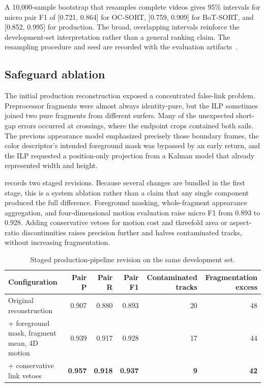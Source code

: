 A 10,000-sample bootstrap that resamples complete videos gives 95\% intervals for
micro pair F1 of [0.721, 0.864] for OC-SORT, [0.759, 0.909] for BoT-SORT, and
[0.852, 0.995] for production.  The broad, overlapping intervals reinforce the
development-set interpretation rather than a general ranking claim.  The resampling
procedure and seed are recorded with the evaluation artifacts~\cite{projectresources}.

\subsection{Safeguard ablation}

The initial production reconstruction exposed a concentrated false-link problem.
Preprocessor fragments were almost always identity-pure, but the ILP sometimes joined
two pure fragments from different surfers.  Many of the unexpected short-gap errors
occurred at crossings, where the endpoint crops contained both sails.  The previous
appearance model emphasized precisely those boundary frames, the color descriptor's
intended foreground mask was bypassed by an early return, and the ILP requested a
position-only projection from a Kalman model that already represented width and
height.

 records two staged revisions.  Because several changes
are bundled in the first stage, this is a system ablation rather than a claim that any
single component produced the full difference.  Foreground masking, whole-fragment
appearance aggregation, and four-dimensional motion evaluation raise micro F1 from
0.893 to 0.928.  Adding conservative vetoes for motion cost and threefold area or
aspect-ratio discontinuities raises precision further and halves contaminated tracks,
without increasing fragmentation.

\begin{table}[t]
  \centering
  \footnotesize
  \caption{Staged production-pipeline revision on the same development set.}
  \label{tab:safeguard-ablation}
  \begin{tabular}{lrrrrr}
    \toprule
    Configuration & Pair P & Pair R & Pair F1 & Contaminated tracks & Fragmentation excess \\
    \midrule
    Original reconstruction & 0.907 & 0.880 & 0.893 & 20 & 48 \\
    + foreground mask, fragment mean, 4D motion & 0.939 & 0.917 & 0.928 & 17 & 44 \\
    + conservative link vetoes & \textbf{0.957} & \textbf{0.918} & \textbf{0.937} & \textbf{9} & \textbf{42} \\
    \bottomrule
  \end{tabular}
\end{table}

